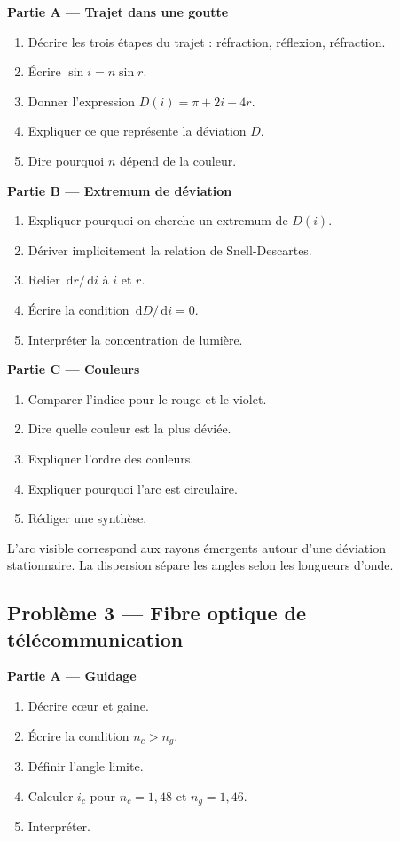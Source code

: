 \documentclass[11pt,a4paper]{article}
\newcommand{\dd}{\,\mathrm d}
\begin{document}
\textbf{Partie A — Trajet dans une goutte}
\begin{enumerate}
  \item Décrire les trois étapes du trajet : réfraction, réflexion, réfraction.
  \item Écrire $\sin i=n\sin r$.
  \item Donner l'expression $D(i)=\pi+2i-4r$.
  \item Expliquer ce que représente la déviation $D$.
  \item Dire pourquoi $n$ dépend de la couleur.
\end{enumerate}

\textbf{Partie B — Extremum de déviation}
\begin{enumerate}
  \item Expliquer pourquoi on cherche un extremum de $D(i)$.
  \item Dériver implicitement la relation de Snell-Descartes.
  \item Relier $\dd r/\dd i$ à $i$ et $r$.
  \item Écrire la condition $\dd D/\dd i=0$.
  \item Interpréter la concentration de lumière.
\end{enumerate}

\textbf{Partie C — Couleurs}
\begin{enumerate}
  \item Comparer l'indice pour le rouge et le violet.
  \item Dire quelle couleur est la plus déviée.
  \item Expliquer l'ordre des couleurs.
  \item Expliquer pourquoi l'arc est circulaire.
  \item Rédiger une synthèse.
\end{enumerate}

\begin{corrigebox}
L'arc visible correspond aux rayons émergents autour d'une déviation stationnaire. La dispersion sépare les angles selon les longueurs d'onde.
\end{corrigebox}

\subsection{Problème 3 — Fibre optique de télécommunication}

\textbf{Partie A — Guidage}
\begin{enumerate}
  \item Décrire cœur et gaine.
  \item Écrire la condition $n_c>n_g$.
  \item Définir l'angle limite.
  \item Calculer $i_c$ pour $n_c=1{,}48$ et $n_g=1{,}46$.
  \item Interpréter.
\end{enumerate}
\end{document}
